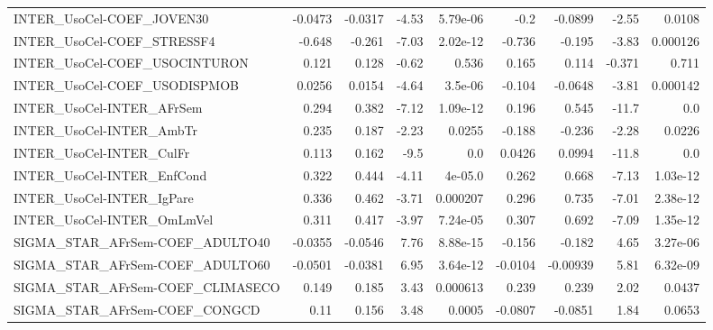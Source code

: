 \begin{tabular}{lrrrrrrrr}
INTER\_UsoCel-COEF\_JOVEN30             &     -0.0473 &      -0.0317 &    -4.53 & 5.79e-06 &       -0.2 &     -0.0899 &        -2.55 &        0.0108 \\
INTER\_UsoCel-COEF\_STRESSF4            &      -0.648 &       -0.261 &    -7.03 & 2.02e-12 &     -0.736 &      -0.195 &        -3.83 &      0.000126 \\
INTER\_UsoCel-COEF\_USOCINTURON         &       0.121 &        0.128 &    -0.62 &    0.536 &      0.165 &       0.114 &       -0.371 &         0.711 \\
INTER\_UsoCel-COEF\_USODISPMOB          &      0.0256 &       0.0154 &    -4.64 &  3.5e-06 &     -0.104 &     -0.0648 &        -3.81 &      0.000142 \\
INTER\_UsoCel-INTER\_AFrSem             &       0.294 &        0.382 &    -7.12 & 1.09e-12 &      0.196 &       0.545 &        -11.7 &           0.0 \\
INTER\_UsoCel-INTER\_AmbTr              &       0.235 &        0.187 &    -2.23 &   0.0255 &     -0.188 &      -0.236 &        -2.28 &        0.0226 \\
INTER\_UsoCel-INTER\_CulFr              &       0.113 &        0.162 &     -9.5 &      0.0 &     0.0426 &      0.0994 &        -11.8 &           0.0 \\
INTER\_UsoCel-INTER\_EnfCond            &       0.322 &        0.444 &    -4.11 &  4e-05.0 &      0.262 &       0.668 &        -7.13 &      1.03e-12 \\
INTER\_UsoCel-INTER\_IgPare             &       0.336 &        0.462 &    -3.71 & 0.000207 &      0.296 &       0.735 &        -7.01 &      2.38e-12 \\
INTER\_UsoCel-INTER\_OmLmVel            &       0.311 &        0.417 &    -3.97 & 7.24e-05 &      0.307 &       0.692 &        -7.09 &      1.35e-12 \\
SIGMA\_STAR\_AFrSem-COEF\_ADULTO40       &     -0.0355 &      -0.0546 &     7.76 & 8.88e-15 &     -0.156 &      -0.182 &         4.65 &      3.27e-06 \\
SIGMA\_STAR\_AFrSem-COEF\_ADULTO60       &     -0.0501 &      -0.0381 &     6.95 & 3.64e-12 &    -0.0104 &    -0.00939 &         5.81 &      6.32e-09 \\
SIGMA\_STAR\_AFrSem-COEF\_CLIMASECO      &       0.149 &        0.185 &     3.43 & 0.000613 &      0.239 &       0.239 &         2.02 &        0.0437 \\
SIGMA\_STAR\_AFrSem-COEF\_CONGCD         &        0.11 &        0.156 &     3.48 &   0.0005 &    -0.0807 &     -0.0851 &         1.84 &        0.0653 \\

\end{tabular}
